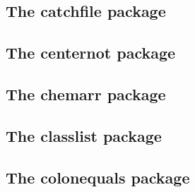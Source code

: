 \documentclass[a4paper,12pt]{article}
\makeatletter
\providecommand*{\plainTeX}{\mbox{plain-\TeX}}
\providecommand*{\eTeX}{$\csname m@th\endcsname\varepsilon$-\TeX}
\newcommand*{\xpackage}[1]{\textsf{#1}}
\newcommand*{\cs}[1]{\texttt{\textbackslash#1}}
\newcommand*{\tocinclude}[1]{%
  \setcounter{tocdepth}{3}%
  \begingroup
    \makeatletter
    \def\@prj{#1}%
    \let\contentsline\foreign@contentsline
  \endgroup
}
\def\foreign@contentsline#1#2#3#4{%
  \ifx\\#4\\%
    \csname l@#1\endcsname{#2}{#3}%
  \else
    \ifHy@linktocpage
      \csname l@#1\endcsname{{#2}}{%
        \hyper@linkfile{#3}{\@prj.pdf}{#4}%
      }%
    \else
      \csname l@#1\endcsname{%
        \hyper@linkfile{#2}{\@prj.pdf}{#4}%
      }{#3}%
    \fi
  \fi
}%
\newcommand*{\pkgsectformat}[1]{%
  \texorpdfstring{%
    \textcolor{link}{The} %
    \xpackage{#1} %
    \textcolor{link}{package}%
  }{#1}%
}
\makeatother
\begin{document}
\newpage
\subsection{\pkgsectformat{catchfile}}
\label{catchfile}
\begin{abstract}
This package catches the contents of a file and puts it in a macro.
It requires \eTeX. Both \LaTeX\ and \plainTeX\ are supported.
\end{abstract}
\tocinclude{catchfile}

\newpage
\subsection{\pkgsectformat{centernot}}
\label{centernot}
\begin{abstract}
This package provides \cs{centernot} that prints the symbol
\cs{not} on the following argument. Unlike \cs{not} the symbol
is horizontally centered.
\end{abstract}
\tocinclude{centernot}

\newpage
\subsection{\pkgsectformat{chemarr}}
\label{chemarr}
\begin{abstract}
Very often chemists need a longer version
of reaction arrows (\cs{rightleftharpoons}) with
the possibility to put text above and below.
Analogous to \xpackage{amsmath}'s \cs{xrightarrow} and
\cs{xleftarrow} this package provides the macro
\cs{xrightleftharpoons}.
\end{abstract}
\tocinclude{chemarr}

\newpage
\subsection{\pkgsectformat{classlist}}
\label{classlist}
\begin{abstract}
This package records the loaded classes and stores
them in a list.
\end{abstract}
\tocinclude{classlist}

\newpage
\subsection{\pkgsectformat{colonequals}}
\label{colonequals}
\begin{abstract}
Package \xpackage{colonequals} defines poor man's symbols
for math relation symbols such as ``colon equals''.
The colon is centered around the horizontal math axis.
\end{abstract}
\tocinclude{colonequals}
\end{document}
